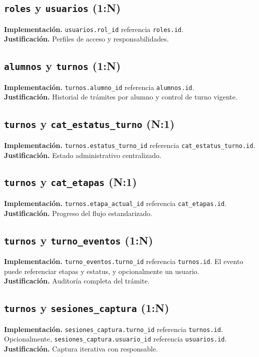 \documentclass[12pt,a4paper]{article}
\begin{document}
\subsection{\texttt{roles} y \texttt{usuarios} (1:N)}
\textbf{Implementación.} \texttt{usuarios.rol\_id} referencia \texttt{roles.id}.\\
\textbf{Justificación.} Perfiles de acceso y responsabilidades.

\subsection{\texttt{alumnos} y \texttt{turnos} (1:N)}
\textbf{Implementación.} \texttt{turnos.alumno\_id} referencia \texttt{alumnos.id}.\\
\textbf{Justificación.} Historial de trámites por alumno y control de turno vigente.

\subsection{\texttt{turnos} y \texttt{cat\_estatus\_turno} (N:1)}
\textbf{Implementación.} \texttt{turnos.estatus\_turno\_id} referencia \texttt{cat\_estatus\_turno.id}.\\
\textbf{Justificación.} Estado administrativo centralizado.

\subsection{\texttt{turnos} y \texttt{cat\_etapas} (N:1)}
\textbf{Implementación.} \texttt{turnos.etapa\_actual\_id} referencia \texttt{cat\_etapas.id}.\\
\textbf{Justificación.} Progreso del flujo estandarizado.

\subsection{\texttt{turnos} y \texttt{turno\_eventos} (1:N)}
\textbf{Implementación.} \texttt{turno\_eventos.turno\_id} referencia \texttt{turnos.id}. El evento puede referenciar etapas y estatus, y opcionalmente un usuario.\\
\textbf{Justificación.} Auditoría completa del trámite.

\subsection{\texttt{turnos} y \texttt{sesiones\_captura} (1:N)}
\textbf{Implementación.} \texttt{sesiones\_captura.turno\_id} referencia \texttt{turnos.id}. Opcionalmente, \texttt{sesiones\_captura.usuario\_id} referencia \texttt{usuarios.id}.\\
\textbf{Justificación.} Captura iterativa con responsable.
\end{document}
